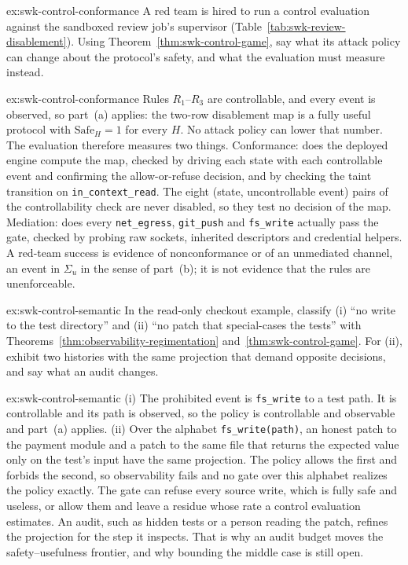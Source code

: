 
\begin{pdexercise}[kind=Check,rating=1]{ex:swk-control-conformance}
A red team is hired to run a control evaluation against the sandboxed review job's supervisor (Table~\ref{tab:swk-review-disablement}). Using Theorem~\ref{thm:swk-control-game}, say what its attack policy can change about the protocol's safety, and what the evaluation must measure instead.
\end{pdexercise}
\begin{pdsolution}{ex:swk-control-conformance}
Rules $R_1$--$R_3$ are controllable, and every event is observed, so part~(a) applies: the two-row disablement map is a fully useful protocol with $\mathrm{Safe}_H=1$ for every $H$. No attack policy can lower that number. The evaluation therefore measures two things. Conformance: does the deployed engine compute the map, checked by driving each state with each controllable event and confirming the allow-or-refuse decision, and by checking the taint transition on \texttt{in\_context\_read}. The eight (state, uncontrollable event) pairs of the controllability check are never disabled, so they test no decision of the map. Mediation: does every \texttt{net\_egress}, \texttt{git\_push} and \texttt{fs\_write} actually pass the gate, checked by probing raw sockets, inherited descriptors and credential helpers. A red-team success is evidence of nonconformance or of an unmediated channel, an event in $\Sigma_u$ in the sense of part~(b); it is not evidence that the rules are unenforceable.
\end{pdsolution}
\begin{pdexercise}[kind=Trace,rating=2]{ex:swk-control-semantic}
In the read-only checkout example, classify (i) ``no write to the test directory'' and (ii) ``no patch that special-cases the tests'' with Theorems~\ref{thm:observability-regimentation} and~\ref{thm:swk-control-game}. For (ii), exhibit two histories with the same projection that demand opposite decisions, and say what an audit changes.
\end{pdexercise}
\begin{pdsolution}{ex:swk-control-semantic}
(i) The prohibited event is \texttt{fs\_write} to a test path. It is controllable and its path is observed, so the policy is controllable and observable and part~(a) applies. (ii) Over the alphabet \texttt{fs\_write(path)}, an honest patch to the payment module and a patch to the same file that returns the expected value only on the test's input have the same projection. The policy allows the first and forbids the second, so observability fails and no gate over this alphabet realizes the policy exactly. The gate can refuse every source write, which is fully safe and useless, or allow them and leave a residue whose rate a control evaluation estimates. An audit, such as hidden tests or a person reading the patch, refines the projection for the step it inspects. That is why an audit budget moves the safety--usefulness frontier, and why bounding the middle case is still open.
\end{pdsolution}
